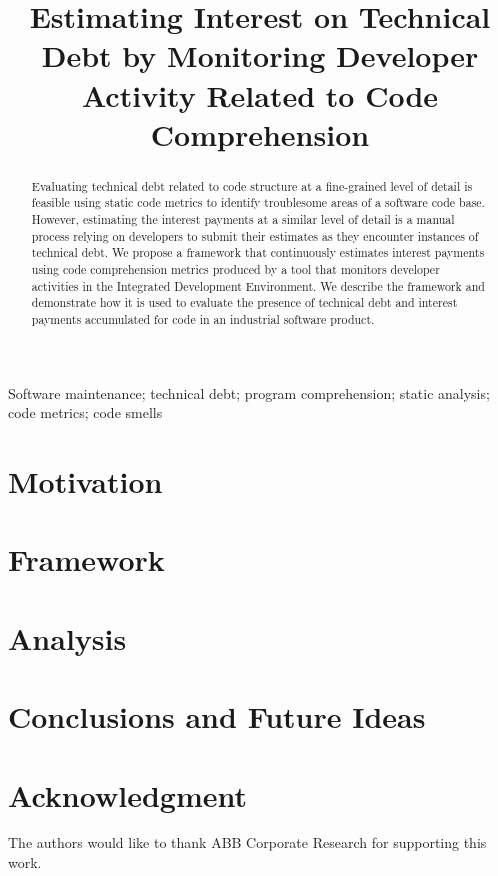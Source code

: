 \documentclass[conference]{IEEEtran}
\begin{document}
\title{Estimating Interest on Technical Debt by Monitoring Developer Activity Related to Code Comprehension}

\author{
\and
{}
}

\maketitle

\begin{abstract}
Evaluating technical debt related to code structure at a fine-grained level of detail is feasible using static code metrics to identify troublesome areas of a software code base.  However, estimating the interest payments at a similar level of detail is a manual process relying on developers to submit their estimates as they encounter instances of technical debt.  We propose a framework that continuously estimates interest payments using code comprehension metrics produced by a tool that monitors developer activities in the Integrated Development Environment.  We describe the framework and demonstrate how it is used to evaluate the presence of technical debt and interest payments accumulated for code in an industrial software product.
\end{abstract}

\begin{IEEEkeywords}
Software maintenance; technical debt; program comprehension; static analysis; code metrics; code smells
\end{IEEEkeywords}

\section{Motivation}


\section{Framework}

\label{sec:DataFramework}
%

\section{Analysis}
\label{sec:AnalysisResults}


\section{Conclusions and Future Ideas}


\section*{Acknowledgment}
The authors would like to thank ABB Corporate Research for supporting this work.



\end{document}
